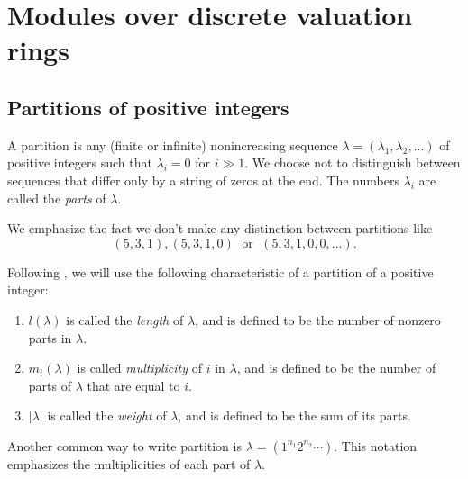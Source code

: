 \section{Modules over discrete valuation rings}
\subsection{Partitions of positive integers}
\begin{dang}
    \begin{definition}\cite{macdonald1998symmetric}
    A partition is any (finite or infinite) nonincreasing sequence $\lambda=(\lambda_1,\lambda_2,\dots)$ of positive integers such that $\lambda_i=0$ for $i\gg 1$. We choose not to distinguish between sequences that differ only by a string of zeros at the end. The numbers $\lambda_i$ are called the \textit{parts} of $\lambda$. 
\end{definition}
\end{dang}
We emphasize the fact we don't make any distinction between partitions like 
\[
(5,3,1),(5,3,1,0) \;\text{ or }\; (5,3,1,0,0,\dots).
\]


\begin{dang}
    \begin{definition}
    Following \cite{macdonald1998symmetric}, we will use the following characteristic of a partition of a positive integer:
        \begin{enumerate}
             \item$l(\lambda)$ is called the \textit{length} of $\lambda$, and is defined to be the number of nonzero parts in $\lambda$.
             \item $m_i(\lambda)$ is called \textit{multiplicity} of $i$ in $\lambda$, and is defined to be the number of parts of $\lambda$ that are equal to $i$.
             \item $|\lambda|$ is called the \textit{weight} of $\lambda$, and is defined to be the sum of its parts.
        \end{enumerate}
    \end{definition}
\end{dang}

\begin{dang}
    \begin{notation}
        Another common way to write partition is $\lambda=(1^{n_1}2^{n_2}\cdots)$. This notation emphasizes the multiplicities of each part of $\lambda$.
    \end{notation}
\end{dang}

